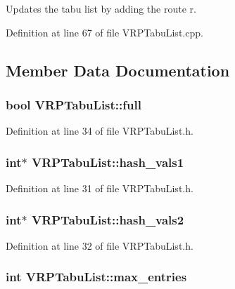 Updates the tabu list by adding the route r.



Definition at line 67 of file VRPTabuList.cpp.



\subsection{Member Data Documentation}
\hypertarget{class_v_r_p_tabu_list_af6fe31640c8f09894386aa0b175adac2}{
\subsubsection[{full}]{\setlength{\rightskip}{0pt plus 5cm}bool {\bf VRPTabuList::full}}}
\label{class_v_r_p_tabu_list_af6fe31640c8f09894386aa0b175adac2}


Definition at line 34 of file VRPTabuList.h.

\hypertarget{class_v_r_p_tabu_list_a75db2b708942566d2150a969642c688a}{
\subsubsection[{hash\_\-vals1}]{\setlength{\rightskip}{0pt plus 5cm}int$\ast$ {\bf VRPTabuList::hash\_\-vals1}}}
\label{class_v_r_p_tabu_list_a75db2b708942566d2150a969642c688a}


Definition at line 31 of file VRPTabuList.h.

\hypertarget{class_v_r_p_tabu_list_a060190495a6a0e1487f28407cee844b4}{
\subsubsection[{hash\_\-vals2}]{\setlength{\rightskip}{0pt plus 5cm}int$\ast$ {\bf VRPTabuList::hash\_\-vals2}}}
\label{class_v_r_p_tabu_list_a060190495a6a0e1487f28407cee844b4}


Definition at line 32 of file VRPTabuList.h.

\hypertarget{class_v_r_p_tabu_list_aa799c64c2debc36aa4b9f75556683041}{
\subsubsection[{max\_\-entries}]{\setlength{\rightskip}{0pt plus 5cm}int {\bf VRPTabuList::max\_\-entries}}}
\label{class_v_r_p_tabu_list_aa799c64c2debc36aa4b9f75556683041}



